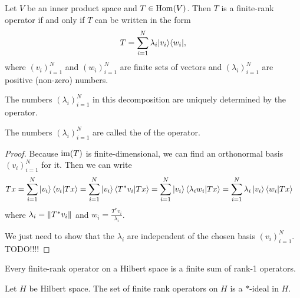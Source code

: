 \begin{proposition} \label{finiteRankSingularValues}
Let $V$ be an inner product space and $T\in\operatorname{Hom}(V)$. Then $T$ is a finite-rank operator \textup{if and only if} $T$ can be written in the form
\[ T = \sum_{i=1}^N \lambda_i |v_i\rangle\langle w_i|, \]
where $(v_i)_{i=1}^N$ and $(w_i)_{i=1}^N$ are finite sets of vectors and $(\lambda_i)_{i=1}^N$ are positive (non-zero) numbers.

The numbers $(\lambda_i)_{i=1}^N$ in this decomposition are uniquely determined by the operator.
\end{proposition}
The numbers $(\lambda_i)_{i=1}^N$ are called the  of the operator.
\begin{proof}
Because $\operatorname{im}(T)$ is finite-dimensional, we can find an orthonormal basis $(v_i)_{i=1}^N$ for it. Then we can write
\begin{align*}
Tx &= \sum_{i=1}^N \ket{v_i}\braket{v_i}{Tx} = \sum_{i=1}^N \ket{v_i}\braket{T^*v_i}{Tx} = \sum_{i=1}^N \ket{v_i}\braket{\lambda_i w_i}{Tx}  = \sum_{i=1}^N \lambda_i\ket{v_i}\braket{w_i}{Tx}
\end{align*}
where $\lambda_i = \lVert T^*v_i\rVert$ and $w_i = \frac{T^*v_i}{\lambda_i}$.

We just need to show that the $\lambda_i$ are independent of the chosen basis $(v_i)_{i=1}^N$. TODO!!!!
\end{proof}
\begin{corollary}
Every finite-rank operator on a Hilbert space is a finite sum of rank-1 operators.
\end{corollary}

\begin{lemma}
Let $H$ be Hilbert space. The set of finite rank operators on $H$ is a $*$-ideal in $H$.
\end{lemma}

